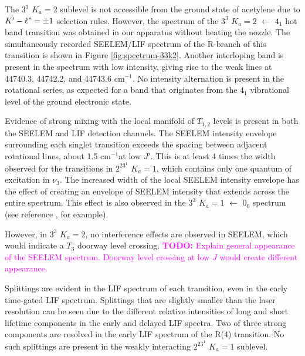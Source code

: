 \documentclass[12pt]{mitthesis}
\newcommand{\TODO} [1]{\textcolor{magenta}{\textbf{TODO:} #1}}
\newcommand{\rcm}{cm$^{-1}$}
\newcommand{\Ka}[1]{$K_a\!\!=\!#1$}
\begin{document}
The $3^3$ \Ka{2} sublevel is not accessible from the ground state of
acetylene due to $K' - \ell" = \pm 1$ selection rules.  However, the
spectrum of the $3^3$ \Ka{2} $\leftarrow$ $4_1$ hot band transition
was obtained in our apparatus without heating the nozzle.  The
simultaneously recorded SEELEM/LIF spectrum of the R-branch of this
transition is shown in Figure \ref{fig:spectrum-33k2}.  Another
interloping band is present in the spectrum with low intensity,
giving rise to the weak lines at 44740.3, 44742.2, and 44743.6 \rcm.
No intensity alternation is present in the rotational series, as
expected for a band that originates from the $4_1$ vibrational level
of the ground electronic state.

Evidence of strong mixing with the local manifold of $T_{1,2}$ levels
is present in both the SEELEM and LIF detection channels.  The SEELEM
intensity envelope surrounding each singlet transition exceeds the
spacing between adjacent rotational lines, about 1.5 \rcm at low $J'$.
This is at least 4 times the width observed for the transitions in
$2^23^1$ \Ka{1}, which contains only one quantum of excitation in
$\nu_3$.  The increased width of the local SEELEM intensity envelope
has the effect of creating an envelope of SEELEM intensity that
extends across the entire spectrum.  This effect is also observed in
the $3^3$ \Ka{1} $\leftarrow$ $0_0$ spectrum (see reference
\cite{humphrey97}, for example).  

However, in $3^3$ \Ka{2}, no interference effects are observed in
SEELEM, which would indicate a $T_3$ doorway level crossing.
\TODO{Explain general appearance of the SEELEM spectrum. Doorway level
  crossing at low $J$ would create different appearance.}

Splittings are evident in the LIF spectrum of each transition, even in
the early time-gated LIF spectrum.  Splittings that are slightly
smaller than the laser resolution can be seen due to the different
relative intensities of long and short lifetime components in the
early and delayed LIF spectra.  Two of three strong components are
resolved in the early LIF spectrum of the R(4) transition.  No such
splittings are present in the weakly interacting $2^23^1$ \Ka{1}
sublevel.

\end{document}
